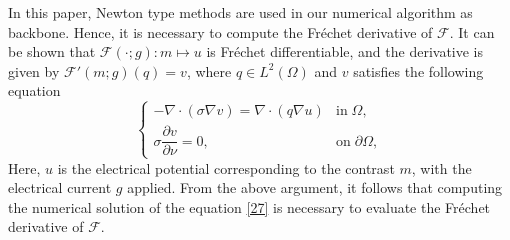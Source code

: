 \documentclass[11pt]{article}
\newcommand{\pa}{\partial}
\begin{document}
In this paper, Newton type methods are used in our numerical algorithm as backbone.
Hence, it is necessary to compute the Fr\'{e}chet derivative of $ \mathcal{F} $.
It can be shown that $ \mathcal{F}(\cdot; g): m\mapsto u $ is Fr\'{e}chet differentiable, and the derivative is given by $ \mathcal{F}'(m;g)(q) = v $, where $ q\in L^2(\Omega) $ and $ v $ satisfies the following equation \cite{JBK12}
\begin{equation}\label{27}
\left\{ \begin{array}{ll}
-\nabla\cdot (\sigma\nabla v) = \nabla\cdot(q\nabla u) & \text{in}\; \Omega,\\
\sigma\dfrac{\pa v}{\pa \nu} = 0, & \text{on}\; \pa \Omega,
\end{array} \right.
\end{equation}
Here, $ u $ is the electrical potential corresponding to the contrast $ m $, with the electrical current $ g $ applied.
From the above argument, it follows that computing the numerical solution of the equation \eqref{27} is necessary to evaluate the Fr\'{e}chet derivative of $\mathcal{F}$.
\end{document}
